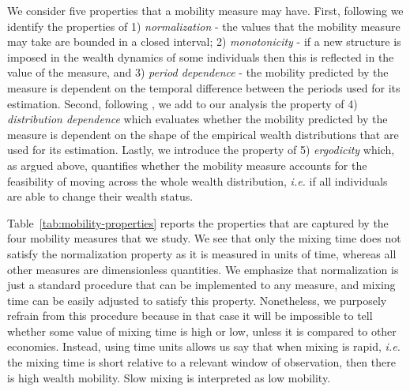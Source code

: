 \documentclass[11pt]{article}
\newcommand{\ie}{{\it i.e.}\xspace}
\numberwithin{equation}{section}
\begin{document}
We consider five properties that a mobility measure may have. First, following \citet{Shorrocks1978} we identify the properties of 1) \textit{normalization} - the values that the mobility measure may take are bounded in a closed interval; 2) \textit{monotonicity} - if a new structure is imposed in the wealth dynamics of some individuals then this is reflected in the value of the measure, and 3) \textit{period dependence} - the mobility predicted by the measure is dependent on the temporal difference between the periods used for its estimation. Second, following \citet{cowell2018measuring}, we add to our analysis the property of 4) \textit{distribution dependence} which evaluates whether the mobility predicted by the measure is dependent on the shape of the empirical wealth distributions that are used for its estimation. Lastly, we introduce the property of 5) \textit{ergodicity} which, as argued above, quantifies whether the mobility measure accounts for the feasibility of moving across the whole wealth distribution, \ie if all individuals are able to change their wealth status.

Table~\ref{tab:mobility-properties} reports the properties that are captured by the four mobility measures that we study. We see that only the mixing time does not satisfy the normalization property as it is measured in units of time, whereas all other measures are dimensionless quantities. We emphasize that normalization is just a standard procedure that can be implemented to any measure, and mixing time can be easily adjusted to satisfy this property. Nonetheless, we purposely refrain from this procedure because in that case it will be impossible to tell whether some value of mixing time is high or low, unless it is compared to other economies. Instead, using time units allows us say that when mixing is rapid, \ie the mixing time is short relative to a relevant window of observation, then there is high wealth mobility. Slow mixing is interpreted as low mobility. %
\end{document}
